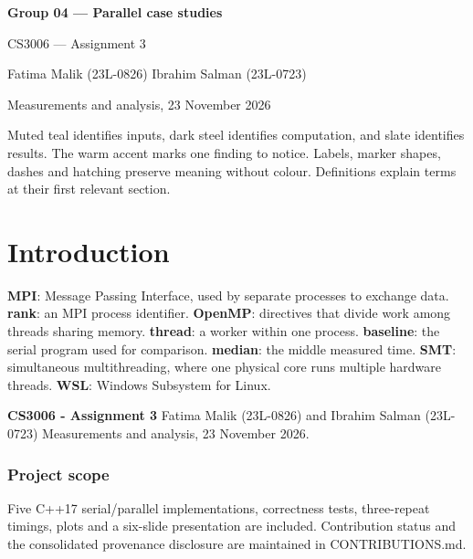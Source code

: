 \documentclass[11pt,a4paper]{article}
\newcommand{\term}[2]{\textbf{#1}: #2.}
\begin{document}
\begin{center}
{\LARGE\bfseries Group 04 --- Parallel case studies}\par
{\large CS3006 --- Assignment 3}\par
Fatima Malik (23L-0826) \quad Ibrahim Salman (23L-0723)\par
Measurements and analysis, 23 November 2026
\end{center}
\tableofcontents
\vspace{4pt}
\begin{tcolorbox}[title=Reading the visual language]
Muted teal identifies inputs, dark steel identifies computation, and slate identifies results.
The warm accent marks one finding to notice. Labels, marker shapes, dashes and hatching
preserve meaning without colour. Definitions explain terms at their first relevant section.
\end{tcolorbox}
\clearpage
\section*{Introduction}


\begin{tcolorbox}[title=Terms used in this section]\small \term{MPI}{Message Passing Interface, used by separate processes to exchange data} \term{rank}{an MPI process identifier} \term{OpenMP}{directives that divide work among threads sharing memory} \term{thread}{a worker within one process} \term{baseline}{the serial program used for comparison} \term{median}{the middle measured time} \term{SMT}{simultaneous multithreading, where one physical core runs multiple hardware threads} \term{WSL}{Windows Subsystem for Linux}\end{tcolorbox}

\textbf{CS3006 - Assignment 3}\newline{} Fatima Malik (23L-0826) and Ibrahim Salman (23L-0723)\newline{} Measurements and analysis, 23 November 2026.


\subsubsection*{Project scope}

Five C++17 serial/\allowbreak{}parallel implementations, correctness tests, three-repeat timings, plots and a six-slide presentation are included. Contribution status and the consolidated provenance disclosure are maintained in CONTRIBUTIONS.md.
\end{document}
